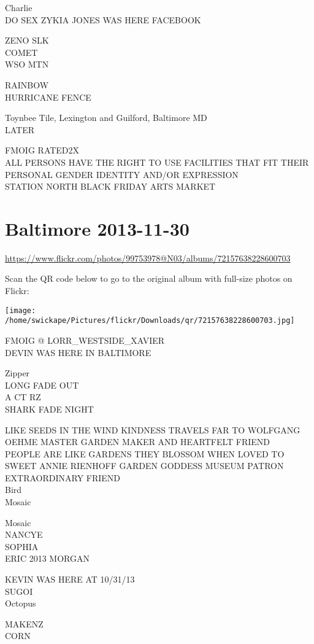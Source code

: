 \documentclass[10pt,letterpaper]{article}
\begin{document}
Charlie\\
DO SEX ZYKIA JONES WAS HERE FACEBOOK

ZENO SLK\\
COMET\\
WSO MTN

RAINBOW\\
HURRICANE FENCE

Toynbee Tile, Lexington and Guilford, Baltimore MD\\
LATER

FMOIG RATED2X\\
ALL PERSONS HAVE THE RIGHT TO USE FACILITIES THAT FIT THEIR PERSONAL GENDER IDENTITY AND/OR EXPRESSION\\
STATION NORTH BLACK FRIDAY ARTS MARKET


\section*{Baltimore 2013-11-30}

\url{https://www.flickr.com/photos/99753978@N03/albums/72157638228600703}

Scan the QR code below to go to the original album with full-size photos on Flickr:

\texttt{[image: /home/swickape/Pictures/flickr/Downloads/qr/72157638228600703.jpg]}


FMOIG @ LORR\_WESTSIDE\_XAVIER\\
DEVIN WAS HERE IN BALTIMORE

Zipper\\
LONG FADE OUT\\
A CT RZ\\
SHARK FADE NIGHT

LIKE SEEDS IN THE WIND KINDNESS TRAVELS FAR TO WOLFGANG OEHME MASTER GARDEN MAKER AND HEARTFELT FRIEND\\
PEOPLE ARE LIKE GARDENS THEY BLOSSOM WHEN LOVED TO SWEET ANNIE RIENHOFF GARDEN GODDESS MUSEUM PATRON EXTRAORDINARY FRIEND\\
Bird\\
Mosaic

Mosaic\\
NANCYE\\
SOPHIA\\
ERIC 2013 MORGAN

KEVIN WAS HERE AT 10/31/13\\
SUGOI\\
Octopus

MAKENZ\\
CORN
\end{document}
